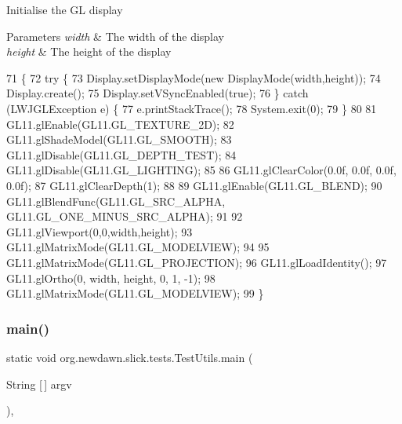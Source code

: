 Initialise the GL display


\begin{DoxyParams}{Parameters}
{\em width} & The width of the display \\
\hline
{\em height} & The height of the display \\
\hline
\end{DoxyParams}

\begin{DoxyCode}
71                                                \{
72         \textcolor{keywordflow}{try} \{
73             Display.setDisplayMode(\textcolor{keyword}{new} DisplayMode(width,height));
74             Display.create();
75             Display.setVSyncEnabled(\textcolor{keyword}{true});
76         \} \textcolor{keywordflow}{catch} (LWJGLException e) \{
77             e.printStackTrace();
78             System.exit(0);
79         \}
80 
81         GL11.glEnable(GL11.GL\_TEXTURE\_2D);
82         GL11.glShadeModel(GL11.GL\_SMOOTH);        
83         GL11.glDisable(GL11.GL\_DEPTH\_TEST);
84         GL11.glDisable(GL11.GL\_LIGHTING);                    
85         
86         GL11.glClearColor(0.0f, 0.0f, 0.0f, 0.0f);                
87         GL11.glClearDepth(1);                                       
88         
89         GL11.glEnable(GL11.GL\_BLEND);
90         GL11.glBlendFunc(GL11.GL\_SRC\_ALPHA, GL11.GL\_ONE\_MINUS\_SRC\_ALPHA);
91         
92         GL11.glViewport(0,0,width,height);
93         GL11.glMatrixMode(GL11.GL\_MODELVIEW);
94 
95         GL11.glMatrixMode(GL11.GL\_PROJECTION);
96         GL11.glLoadIdentity();
97         GL11.glOrtho(0, width, height, 0, 1, -1);
98         GL11.glMatrixMode(GL11.GL\_MODELVIEW);
99     \}
\end{DoxyCode}
\mbox{\label{classorg_1_1newdawn_1_1slick_1_1tests_1_1_test_utils_a03e6ed0e15f3f86b48678943e08a34a5}} 
\subsubsection{\texorpdfstring{main()}{main()}}
{\footnotesize\ttfamily static void org.\+newdawn.\+slick.\+tests.\+Test\+Utils.\+main (\begin{DoxyParamCaption}\item[{String \mbox{[}$\,$\mbox{]}}]{argv }\end{DoxyParamCaption})\hspace{0.3cm}{\ttfamily [inline]}, {\ttfamily [static]}}

